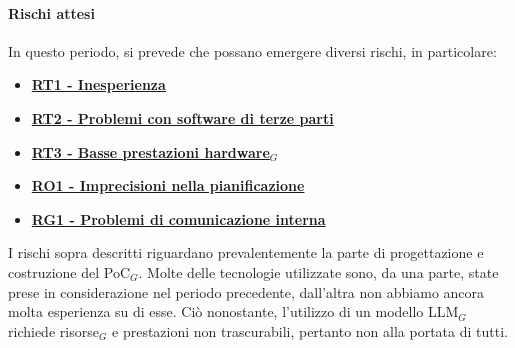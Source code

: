 \paragraph{Rischi attesi}  
In questo periodo, si prevede che possano emergere diversi rischi, in particolare:

\begin{itemize}
    \item \textbf{\hyperlink{RT1}{RT1 - Inesperienza}}
    \item \textbf{\hyperlink{RT2}{RT2 - Problemi con software di terze parti}}
    \item \textbf{\hyperlink{RT3}{RT3 - Basse prestazioni hardware$_G$}}
    \item \textbf{\hyperlink{RO1}{RO1 - Imprecisioni nella pianificazione}}
    \item \textbf{\hyperlink{RG1}{RG1 - Problemi di comunicazione interna}}
\end{itemize}

I rischi sopra descritti riguardano prevalentemente la parte di progettazione e costruzione del PoC$_G$. Molte delle tecnologie utilizzate sono, da una parte, state prese in considerazione nel periodo precedente, dall'altra non abbiamo ancora molta esperienza su di esse. Ciò nonostante, l'utilizzo di un modello LLM$_G$ richiede risorse$_G$ e prestazioni non trascurabili, pertanto non alla portata di tutti.

